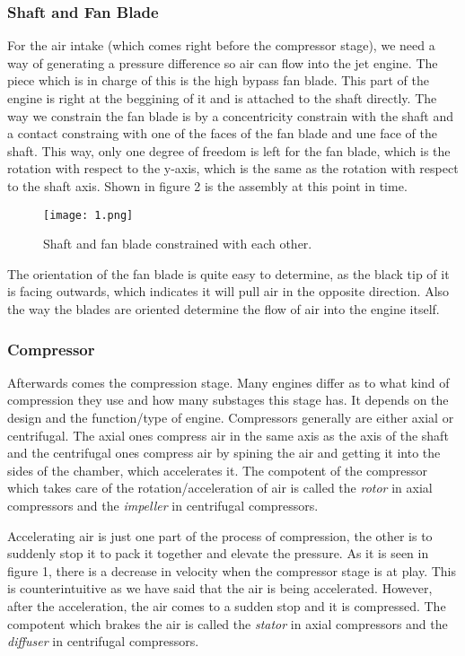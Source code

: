 \documentclass[12pt, letterpaper]{article}
\begin{document}
\subsubsection*{Shaft and Fan Blade}
For the air intake (which comes right before the compressor stage), we need a way of generating a pressure difference so air can flow into the jet engine. The piece which is in charge of this is the high bypass fan blade. This part of the engine is right at the beggining of it and is attached to the shaft directly. The way we constrain the fan blade is by a concentricity constrain with the shaft and a contact constraing with one of the faces of the fan blade and une face of the shaft. This way, only one degree of freedom is left for the fan blade, which is the rotation with respect to the y-axis, which is the same as the rotation with respect to the shaft axis. Shown in figure 2 is the assembly at this point in time.

\begin{figure}[H]
	\centering
	\texttt{[image: 1.png]}
	\caption{Shaft and fan blade constrained with each other.}
\end{figure}

The orientation of the fan blade is quite easy to determine, as the black tip of it is facing outwards, which indicates it will pull air in the opposite direction. Also the way the blades are oriented determine the flow of air into the engine itself.

\subsubsection*{Compressor}
Afterwards comes the compression stage. Many engines differ as to what kind of compression they use and how many substages this stage has. It depends on the design and the function/type of engine. Compressors generally are either axial or centrifugal. The axial ones compress air in the same axis as the axis of the shaft and the centrifugal ones compress air by spining the air and getting it into the sides of the chamber, which accelerates it. The compotent of the compressor which takes care of the rotation/acceleration of air is called the \textit{rotor} in axial compressors and the \textit{impeller} in centrifugal compressors.

Accelerating air is just one part of the process of compression, the other is to suddenly stop it to pack it together and elevate the pressure. As it is seen in figure 1, there is a decrease in velocity when the compressor stage is at play. This is counterintuitive as we have said that the air is being accelerated. However, after the acceleration, the air comes to a sudden stop and it is compressed. The compotent which brakes the air is called the \textit{stator} in axial compressors and the \textit{diffuser} in centrifugal compressors. 
\end{document}
